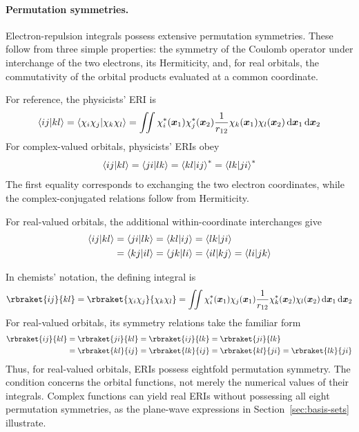 \documentclass[11pt,a4paper,titlepage]{article}
\numberwithin{equation}{section}
\newcommand{\bx}{\boldsymbol{x}}
\newcommand{\red}[1]{\textcolor{hfRed}{#1}}
\newcommand{\green}[1]{\textcolor{hfGreen}{#1}}
\begin{document}
\paragraph{Permutation symmetries.}

Electron-repulsion integrals possess extensive permutation symmetries. These
follow from three simple properties: the symmetry of the Coulomb operator
under interchange of the two electrons, its Hermiticity, and, for real
orbitals, the commutativity of the orbital products evaluated at a common
coordinate.

For reference, the physicists' ERI is
\begin{equation}
  \braket{ij}{kl}
  =
  \braket{\chi_i\chi_j}{\chi_k\chi_l}
  =
  \iint
  \chi_i^*(\bx_1)
  \chi_j^*(\bx_2)
  \frac{1}{r_{12}}
  \chi_k(\bx_1)
  \chi_l(\bx_2)
  \dd{\bx_1}\dd{\bx_2}
\end{equation}
For \red{complex-valued orbitals}, physicists' ERIs obey
\begin{equation}
  \braket{ij}{kl}
  =
  \braket{ji}{lk}
  =
  \braket{kl}{ij}^*
  =
  \braket{lk}{ji}^*
  \label{eq:eri-complex-symmetry}
\end{equation}
The first equality corresponds to exchanging the two electron coordinates,
while the complex-conjugated relations follow from Hermiticity.

For \green{real-valued orbitals}, the additional within-coordinate
interchanges give
\begin{equation}
\begin{split}
  \braket{ij}{kl}
  &=
  \braket{ji}{lk}
  =
  \braket{kl}{ij}
  =
  \braket{lk}{ji}
  \\
  &=
  \braket{kj}{il}
  =
  \braket{jk}{li}
  =
  \braket{il}{kj}
  =
  \braket{li}{jk}
  \label{eq:eri-physicists-eightfold}
\end{split}
\end{equation}

In chemists' notation, the defining integral is
\begin{equation}
  \rbraket{ij}{kl}
  =
  \rbraket{\chi_i\chi_j}{\chi_k\chi_l}
  =
  \iint
  \chi_i^*(\bx_1)
  \chi_j(\bx_1)
  \frac{1}{r_{12}}
  \chi_k^*(\bx_2)
  \chi_l(\bx_2)
  \dd{\bx_1}\dd{\bx_2}
\end{equation}
For \green{real-valued orbitals}, its symmetry relations take the familiar
form
\begin{equation}
\begin{split}
  \rbraket{ij}{kl}
  &=
  \rbraket{ji}{kl}
  =
  \rbraket{ij}{lk}
  =
  \rbraket{ji}{lk}
  \\
  &=
  \rbraket{kl}{ij}
  =
  \rbraket{lk}{ij}
  =
  \rbraket{kl}{ji}
  =
  \rbraket{lk}{ji}
  \label{eq:eri-chemists-eightfold}
\end{split}
\end{equation}
Thus, for real-valued orbitals, ERIs possess
eightfold permutation symmetry.
The condition concerns the orbital functions, not merely the numerical
values of their integrals. Complex functions can yield real ERIs without
possessing all eight permutation symmetries, as the plane-wave expressions
in Section~\ref{sec:basis-sets} illustrate.
\end{document}
